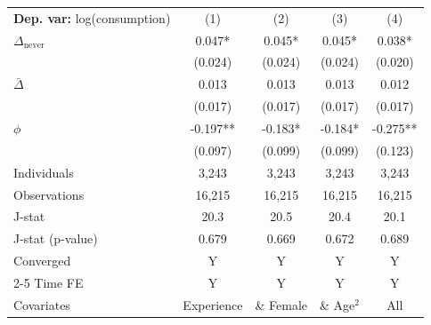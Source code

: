 \begin{tabular}{l cccc} \toprule  \textbf{Dep. var:}  log(consumption) 
                    &\multicolumn{1}{c}{(1)}   &\multicolumn{1}{c}{(2)}   &\multicolumn{1}{c}{(3)}   &\multicolumn{1}{c}{(4)}   \\

\addlinespace
$\Delta_{\text{never}}$&       0.047*  &       0.045*  &       0.045*  &       0.038*  \\
                    &     (0.024)   &     (0.024)   &     (0.024)   &     (0.020)   \\

\addlinespace
$\bar{\Delta}$      &       0.013   &       0.013   &       0.013   &       0.012   \\
                    &     (0.017)   &     (0.017)   &     (0.017)   &     (0.017)   \\

\addlinespace
$\phi$              &      -0.197** &      -0.183*  &      -0.184*  &      -0.275** \\
                    &     (0.097)   &     (0.099)   &     (0.099)   &     (0.123)   \\
\addlinespace
Individuals         &       3,243   &       3,243   &       3,243   &       3,243   \\
Observations        &      16,215   &      16,215   &      16,215   &      16,215   \\
J-stat              &        20.3   &        20.5   &        20.4   &        20.1   \\
J-stat (p-value)    &       0.679   &       0.669   &       0.672   &       0.689   \\
Converged           &           Y   &           Y   &           Y   &           Y   \\
\cmidrule{2-5} Time FE & Y & Y & Y & Y \\ Covariates & Experience & \& Female & \& Age$^2$ & All \\ \bottomrule \end{tabular}
